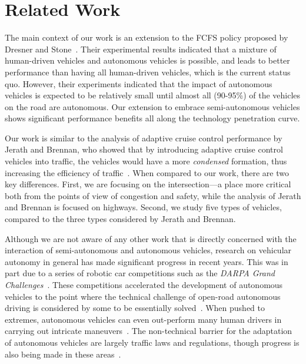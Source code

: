 \section{Related Work}
\label{sec:related}

The main context of our work is an extension to the FCFS policy
proposed by Dresner and Stone~\cite{bib:Dresner08Multiagent}. Their
experimental results indicated that a mixture of human-driven vehicles
and autonomous vehicles is possible, and leads to better performance
than having all human-driven vehicles, which is the current status
quo.  However, their experiments indicated that the impact of
autonomous vehicles is expected to be relatively small until almost all (90-95\%) of
the vehicles on the road are autonomous.  Our extension to embrace
semi-autonomous vehicles shows significant performance benefits all
along the technology penetration curve.

Our work is similar to the analysis of adaptive cruise control
performance by Jerath and Brennan, who showed that by introducing
adaptive cruise control vehicles into traffic, the vehicles would have
a more \textit{condensed} formation, thus increasing the efficiency
of traffic~\cite{bib:Jerath10adaptive}.  When compared to our work,
there are two key differences.  First, we are focusing on the
intersection---a place more critical both from the points of view of
congestion and safety, while the analysis of Jerath and Brennan is
focused on highways.  Second, we study five types of vehicles,
compared to the three types considered by Jerath and Brennan.

Although we are not aware of any other work that is directly concerned
with the interaction of semi-autonomous and autonomous vehicles,
research on vehicular autonomy in general has made significant
progress in recent years.  This was in part due to a series of robotic
car competitions such as the \emph{DARPA Grand
Challenges}~\cite{DARPAGrandChallenge}.  These competitions
accelerated the development of autonomous vehicles to the point where
the technical challenge of open-road autonomous driving is considered
by some to be essentially solved~\cite{bib:Dresner08Multiagent}.  When
pushed to extremes, autonomous vehicles can even out-perform many
human drivers in carrying out intricate
maneuvers~\cite{Squatriglia2010}. The non-technical barrier for the
adaptation of autonomous vehicles are largely traffic laws and
regulations, though progress is also being made in these
areas~\cite{calo2011-nevada}.


